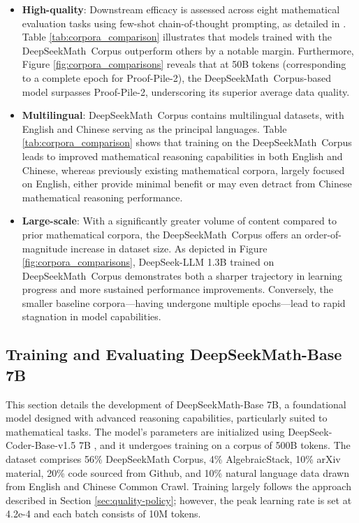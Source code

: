 \begin{itemize}[topsep=0pt]
\begin{itemize}[topsep=0pt]
    \item \textbf{High-quality}: 
    Downstream efficacy is assessed across eight mathematical evaluation tasks using few-shot chain-of-thought prompting, as detailed in \cite{cot}. Table \ref{tab:corpora_comparison} illustrates that models trained with the DeepSeekMath~Corpus outperform others by a notable margin. Furthermore, Figure \ref{fig:corpora_comparisons} reveals that at 50B tokens (corresponding to a complete epoch for Proof-Pile-2), the DeepSeekMath~Corpus-based model surpasses Proof-Pile-2, underscoring its superior average data quality.
    \item \textbf{Multilingual}:
    DeepSeekMath~Corpus contains multilingual datasets, with English and Chinese serving as the principal languages. Table \ref{tab:corpora_comparison} shows that training on the DeepSeekMath~Corpus leads to improved mathematical reasoning capabilities in both English and Chinese, whereas previously existing mathematical corpora, largely focused on English, either provide minimal benefit or may even detract from Chinese mathematical reasoning performance.
    \item \textbf{Large-scale}:
    With a significantly greater volume of content compared to prior mathematical corpora, the DeepSeekMath~Corpus offers an order-of-magnitude increase in dataset size. As depicted in Figure \ref{fig:corpora_comparisons}, DeepSeek-LLM 1.3B trained on DeepSeekMath~Corpus demonstrates both a sharper trajectory in learning progress and more sustained performance improvements. Conversely, the smaller baseline corpora—having undergone multiple epochs—lead to rapid stagnation in model capabilities.
\end{itemize}

\subsection{Training and Evaluating DeepSeekMath-Base 7B}

This section details the development of DeepSeekMath-Base 7B, a foundational model designed with advanced reasoning capabilities, particularly suited to mathematical tasks. The model’s parameters are initialized using DeepSeek-Coder-Base-v1.5 7B \citep{deepseek-coder}, and it undergoes training on a corpus of 500B tokens. The dataset comprises 56\% DeepSeekMath Corpus, 4\% AlgebraicStack, 10\% arXiv material, 20\% code sourced from Github, and 10\% natural language data drawn from English and Chinese Common Crawl. Training largely follows the approach described in Section \ref{sec:quality-policy}; however, the peak learning rate is set at 4.2e-4 and each batch consists of 10M tokens.


\end{itemize}
